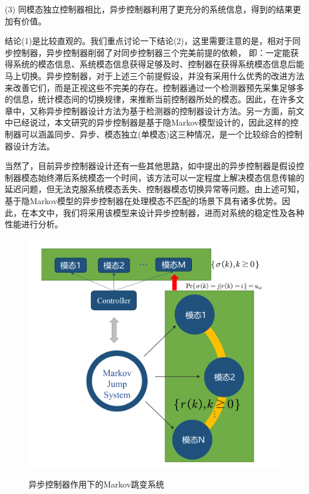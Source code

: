 		(3) 同模态独立控制器相比，异步控制器利用了更充分的系统信息，得到的结果更加有价值。
		
		结论(1)是比较直观的。我们重点讨论一下结论(2)，这里需要注意的是，相对于同步控制器，异步控制器削弱了对同步控制器三个完美前提的依赖， 即：一定能获得系统的模态信息、系统模态信息获得足够及时、控制器在获得系统模态信息后能马上切换。异步控制器，对于上述三个前提假设，并没有采用什么优秀的改进方法来改善它们，而是正视这些不完美的存在。控制器通过一个检测器预先采集足够多的信息，统计模态间的切换规律，来推断当前控制器所处的模态。因此，在许多文章中，又称异步控制器设计方法为基于检测器的控制器设计方法。另一方面，前文中已经说过，本文研究的异步控制器是基于隐Markov模型设计的，因此这样的控制器可以涵盖同步、异步、模态独立(单模态)这三种情况，是一个比较综合的控制器设计方法。
		
		当然了，目前异步控制器设计还有一些其他思路，如\cite{zhang2009stability}中提出的异步控制器是假设控制器模态始终滞后系统模态一个时间，该方法可以一定程度上解决模态信息传输的延迟问题，但无法克服系统模态丢失、控制器模态切换异常等问题。由上述可知，基于隐Markov模型的异步控制器在处理模态不匹配的场景下具有诸多优势。因此，在本文中，我们将采用该模型来设计异步控制器，进而对系统的稳定性及各种性能进行分析。
	
	\begin{figure}[!htb] 
		\centering\includegraphics[scale=0.12]{./figures/introduction/asynsys.png}\\ 
		\caption{异步控制器作用下的Markov跳变系统}
		\label{intro_fig_asynsys}
	\end{figure}
	
